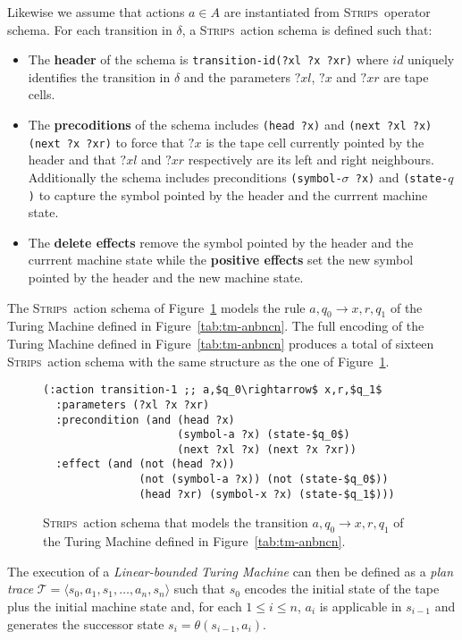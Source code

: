 \documentclass[letterpaper]{article} %
\newcommand{\tup}[1]{{\langle #1 \rangle}}
\newcommand{\strips}{\textsc{Strips}}     %
\begin{document}
Likewise we assume that actions $a\in A$ are instantiated from \strips\ operator schema. For each transition in $\delta$, a \strips\ action schema is defined such that:
\begin{itemize}
\item The {\bf header} of the schema is {\tt transition-id(?xl ?x ?xr)} where $id$ uniquely identifies the transition in $\delta$ and the parameters $?xl$, $?x$ and $?xr$ are tape cells.
\item The {\bf precoditions} of the schema includes {\tt(head ?x)} and {\tt (next ?xl ?x) (next ?x ?xr)} to force that $?x$ is the tape cell currently pointed by the header and that $?xl$ and $?xr$ respectively are its left and right neighbours. Additionally the schema includes preconditions {\tt(symbol-$\sigma$ ?x)} and {\tt (state-$q$)} to capture the symbol pointed by the header and the currrent machine state.
\item The {\bf delete effects} remove the symbol pointed by the header and the currrent machine state while the {\bf positive effects} set the new symbol pointed by the header and the new machine state.
\end{itemize}

The \strips\ action schema of Figure~\ref{fig:update-rule} models the rule $a,q_0\rightarrow x,r,q_1$ of the Turing Machine defined in Figure~\ref{tab:tm-anbncn}. The full encoding of the Turing Machine defined in Figure~\ref{tab:tm-anbncn} produces a total of sixteen \strips\ action schema with the same structure as the one of Figure~\ref{fig:update-rule}. 
\begin{figure}[hbt!]
\begin{scriptsize}
\begin{lstlisting}
(:action transition-1 ;; a,$q_0\rightarrow$ x,r,$q_1$
  :parameters (?xl ?x ?xr)
  :precondition (and (head ?x)                       
                     (symbol-a ?x) (state-$q_0$)
                     (next ?xl ?x) (next ?x ?xr))
  :effect (and (not (head ?x)) 
               (not (symbol-a ?x)) (not (state-$q_0$))
               (head ?xr) (symbol-x ?x) (state-$q_1$)))
\end{lstlisting}
\end{scriptsize}
 \caption{\small \strips\ action schema that models the transition $a,q_0\rightarrow x,r,q_1$ of the Turing Machine defined in Figure~\ref{tab:tm-anbncn}.}
\label{fig:update-rule}
\end{figure}

The execution of a {\em Linear-bounded Turing Machine} can then be defined as a {\em plan trace} $\mathcal{T}=\tup{s_0,a_1,s_1,\ldots,a_n,s_n}$ such that $s_0$ encodes the initial state of the tape plus the initial machine state and, for each {\small $1\leq i\leq n$}, $a_i$ is applicable in $s_{i-1}$ and generates the successor state $s_i=\theta(s_{i-1},a_i)$. 
\end{document}

